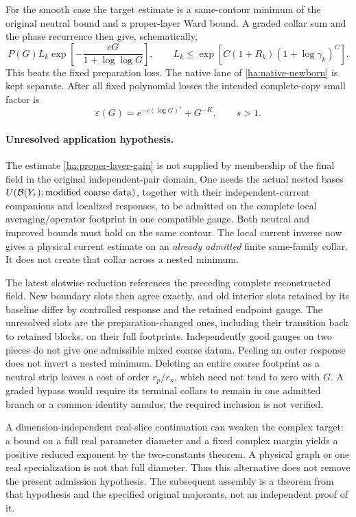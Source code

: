 For the smooth case the target estimate is a same-contour minimum of
the original neutral bound and a proper-layer Ward bound.  A graded
collar sum and the phase recurrence then give, schematically,
\begin{equation}
 P(G)L_k\exp\!\left[-\frac{cG}{1+\log\log G}\right],
 \qquad
 L_k\leq\exp[C(1+R_k)(1+\log\gamma_k)^C].
 \label{ha:proper-layer-gain}
\end{equation}
This beats the fixed preparation loss.  The native lane of
\eqref{ha:native-newborn} is kept separate.  After all fixed polynomial
losses the intended complete-copy small factor is
\begin{equation}
 \varepsilon(G)=e^{-c(\log G)^s}+G^{-K},\qquad s>1.
 \label{ha:epsilon}
\end{equation}

\paragraph{Unresolved application hypothesis.}
The estimate \eqref{ha:proper-layer-gain} is not supplied by membership
of the final field in the original independent-pair domain.  One needs
the actual nested bases
$U(\mathcal B(Y_r);\hbox{modified coarse data})$, together with their
independent-current companions and localized responses, to be admitted
on the complete local averaging/operator footprint in one compatible
gauge.  Both neutral and improved bounds must hold on the same contour.
The local current inverse now gives a physical current estimate on an
\emph{already admitted} finite same-family collar.  It does not create
that collar across a nested minimum.

The latest slotwise reduction references the preceding complete
reconstructed field.  New boundary slots then agree exactly, and old
interior slots retained by its baseline differ by controlled response
and the retained endpoint gauge.  The unresolved slots are the
preparation-changed ones, including their transition back to retained
blocks, on their full footprints.  Independently good gauges on two
pieces do not give one admissible mixed coarse datum.  Peeling an outer
response does not invert a nested minimum.  Deleting an entire coarse
footprint as a neutral strip leaves a cost of order $r_p/r_n$, which
need not tend to zero with $G$.  A graded bypass would require its
terminal collars to remain in one admitted branch or a common identity
annulus; the required inclusion is not verified.

A dimension-independent real-slice continuation can weaken the complex
target: a bound on a full real parameter diameter and a fixed complex
margin yields a positive reduced exponent by the two-constants theorem.
A physical graph or one real specialization is not that full diameter.
Thus this alternative does not remove the present admission hypothesis.
The subsequent assembly is a theorem from that hypothesis and the
specified original majorants, not an independent proof of it.

